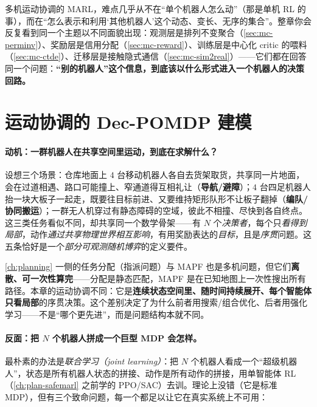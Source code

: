 \begin{insight}[整章的统一主题]
多机运动协调的 MARL，难点几乎从不在“单个机器人怎么动”（那是单机 RL 的事），而在“怎么表示和利用‘其他机器人’这个动态、变长、无序的集合”。整章你会反复看到同一个主题以不同面貌出现：观测层是排列不变聚合（\cref{sec:mc-perminv}）、奖励层是信用分配（\cref{sec:mc-reward}）、训练层是中心化 critic 的喂料（\cref{sec:mc-ctde}）、迁移层是接触隐式通信（\cref{sec:mc-sim2real}）——它们都在回答同一个问题：\textbf{“别的机器人”这个信息，到底该以什么形式进入一个机器人的决策回路。}
\end{insight}

\section{运动协调的 Dec-POMDP 建模}
\label{sec:mc-decpomdp}

\paragraph{动机：一群机器人在共享空间里运动，到底在求解什么？}
设想三个场景：仓库地面上 $4$ 台移动机器人各自去货架取货，共享同一片地面，会在过道相遇、路口可能撞上、窄通道得互相礼让（\textbf{导航/避障}）；$4$ 台四足机器人抬一块大板子一起走，既要往目标前进、又要维持矩形队形不让板子翻掉（\textbf{编队/协同搬运}）；一群无人机穿过有静态障碍的空域，彼此不相撞、尽快到各自终点。这三类任务看似不同，却共享同一个数学骨架——有 $N$ 个\emph{决策者}，每个只\emph{看得到局部}，动作\emph{通过共享物理世界相互影响}，有用奖励表达的\emph{目标}，且是\emph{序贯}问题。这五条恰好是一个\emph{部分可观测随机博弈}的定义要件。

\begin{insight}[与离散多机问题的本质区别]
\cref{ch:planning} 一侧的任务分配（指派问题）与 MAPF 也是多机问题，但它们\textbf{离散、可一次性算完}——分配是静态匹配，MAPF 是在已知地图上一次性搜出所有路径。本章的运动协调不同：它是\textbf{连续状态空间里、随时间持续展开、每个智能体只看局部}的序贯决策。这个差别决定了为什么前者用搜索/组合优化、后者用强化学习——不是“哪个更先进”，而是问题结构本就不同。
\end{insight}

\paragraph{反面：把 $N$ 个机器人拼成一个巨型 MDP 会怎样。}
最朴素的办法是\emph{联合学习（joint learning）}：把 $N$ 个机器人看成一个“超级机器人”，状态是所有机器人状态的拼接、动作是所有动作的拼接，用单智能体 RL（\cref{ch:plan-safemarl} 之前学的 PPO/SAC）去训。理论上没错（它是标准 MDP），但有三个致命问题，每一个都足以让它在真实系统上不可用：

